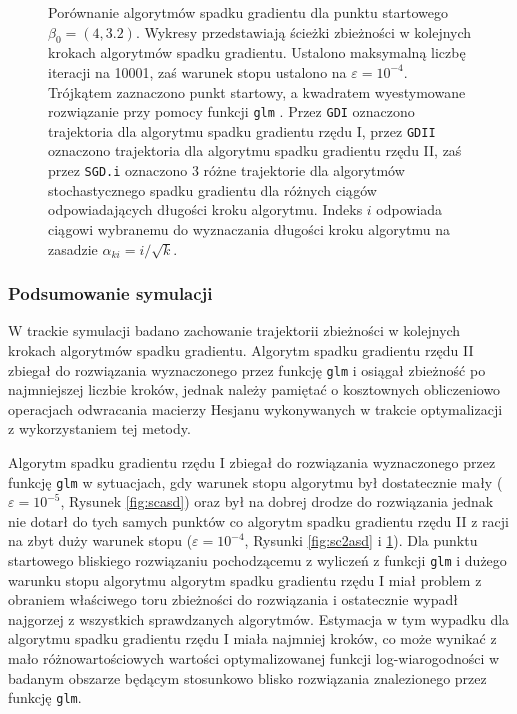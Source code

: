 \begin{figure}[hbt!]
  \caption[Porównanie algorytmów spadku gradientu dla punktu startowego $\beta_0 = (4,3.2)$.]{\label{fig:sc4asd}Porównanie algorytmów spadku gradientu dla punktu startowego $\beta_0 = (4,3.2)$. Wykresy przedstawiają ścieżki zbieżności w kolejnych krokach algorytmów spadku gradientu. Ustalono maksymalną liczbę iteracji na 10001, zaś warunek stopu ustalono na $\varepsilon=10^{-4}$. Trójkątem zaznaczono punkt startowy, a kwadratem wyestymowane rozwiązanie przy pomocy funkcji \texttt{glm} \cite{glmglm}. Przez \texttt{GDI} oznaczono trajektoria dla algorytmu spadku gradientu rzędu I, przez \texttt{GDII} oznaczono trajektoria dla algorytmu spadku gradientu rzędu II, zaś przez \texttt{SGD.i} oznaczono 3 różne trajektorie dla algorytmów stochastycznego spadku gradientu dla różnych ciągów odpowiadających długości kroku algorytmu. Indeks $i$ odpowiada ciągowi wybranemu do wyznaczania długości kroku algorytmu na zasadzie $\alpha_{ki} = i/\sqrt{k}$.}
\end{figure}


\newpage

\subsubsection{Podsumowanie symulacji}
W trackie symulacji badano zachowanie trajektorii zbieżności w kolejnych krokach algorytmów spadku gradientu. Algorytm spadku gradientu rzędu II zbiegał do rozwiązania wyznaczonego przez funkcję \texttt{glm} \cite{glmglm} i osiągał zbieżność po najmniejszej liczbie kroków, jednak należy pamiętać o kosztownych obliczeniowo operacjach odwracania macierzy Hesjanu wykonywanych w trakcie optymalizacji z wykorzystaniem tej metody. 

Algorytm spadku gradientu rzędu I zbiegał do rozwiązania wyznaczonego przez funkcję \texttt{glm} w sytuacjach, gdy warunek stopu algorytmu był dostatecznie mały ($\varepsilon = 10^{-5}$, Rysunek \ref{fig:scasd}) oraz był na dobrej drodze do rozwiązania jednak nie dotarł do tych samych punktów co algorytm spadku gradientu rzędu II z racji na zbyt duży warunek stopu ($\varepsilon = 10^{-4}$, Rysunki \ref{fig:sc2asd} i \ref{fig:sc4asd}). Dla punktu startowego bliskiego rozwiązaniu pochodzącemu z wyliczeń z funkcji \texttt{glm} i dużego warunku stopu algorytmu algorytm spadku gradientu rzędu I miał problem z obraniem właściwego toru zbieżności do rozwiązania i ostatecznie wypadł najgorzej z wszystkich sprawdzanych algorytmów. Estymacja w tym wypadku dla algorytmu spadku gradientu rzędu I miała najmniej kroków, co może wynikać z mało różnowartościowych wartości optymalizowanej funkcji log-wiarogodności w badanym obszarze będącym stosunkowo blisko rozwiązania znalezionego przez funkcję \texttt{glm}.

